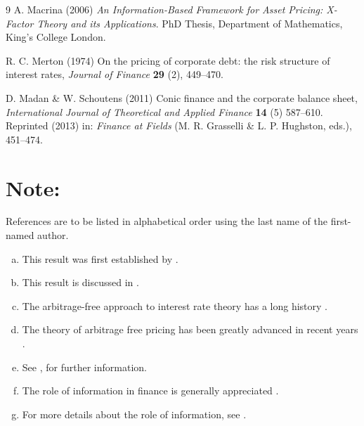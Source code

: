\documentclass{ws-ijtaf}
\begin{document}
\begin{thebibliography}{9}
 A. Macrina (2006) {\it An Information-Based Framework for Asset Pricing: X-Factor Theory and its Applications}. PhD Thesis, Department of Mathematics, King's College London.

 R. C. Merton (1974) On the pricing of corporate debt: the risk structure of interest rates,
{\it Journal of Finance} {\bf 29} (2), 449--470.

 D. Madan \& W. Schoutens (2011) Conic finance and the corporate balance sheet, {\it International Journal of Theoretical and Applied Finance} {\bf 14} (5) 587--610. Reprinted (2013) in: {\it Finance at Fields} (M. R. Grasselli \& L. P. Hughston, eds.), 451--474.
\end{thebibliography}

\section*{Note:}

References are to be listed in alphabetical order using the last name of the first-named author.


\begin{enumerate}[(f)]
\item[(a)] This result was first established by \cite{mer74}.
\item[(b)] This result is discussed in \cite{mer74}.
\item[(c)] The arbitrage-free approach to interest rate theory has a long history \citep{mer74}.
\item[(d)] The theory of arbitrage free pricing has been greatly advanced in recent years \citep{del94,kar98,duf01}.
\item[(e)] See \cite{del94,kar98,duf01}, for further information.
\item[(f)] The role of information in finance is generally appreciated \citep{bro07,bro08a,bro08b}.
\item[(g)] For more details about the role of information, see \cite{bro07,bro08a,bro08b}.
\end{enumerate}
\end{document}
